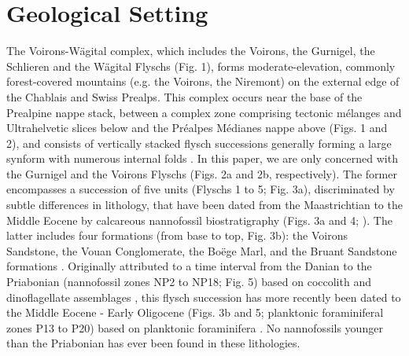 \documentclass[twoside]{article}
\begin{document}
\section{Geological Setting}

The Voirons-Wägital complex, which includes the Voirons, the Gurnigel, the Schlieren and the Wägital Flyschs (Fig. 1), forms moderate-elevation, commonly forest-covered mountains (e.g. the Voirons, the Niremont) on the external edge of the Chablais and Swiss Prealps. This complex occurs near the base of the Prealpine nappe stack, between a complex zone comprising tectonic mélanges and Ultrahelvetic slices below and the Préalpes Médianes nappe above (Figs. 1 and 2), and consists of vertically stacked flysch successions generally forming a large synform with numerous internal folds \citep{Weidmann1976a,Morel1980b,Winkler1983,Ospina-Ostios2017}. In this paper, we are only concerned with the Gurnigel and the Voirons Flyschs (Figs. 2a and 2b, respectively). The former encompasses a succession of five units (Flyschs 1 to 5; Fig. 3a), discriminated by subtle differences in lithology, that have been dated from the Maastrichtian to the Middle Eocene by calcareous nannofossil biostratigraphy (Figs. 3a and 4; \citealp{Weidmann1976a,Morel1980b}). The latter includes four formations (from base to top, Fig. 3b): the Voirons Sandstone, the Vouan Conglomerate, the Boëge Marl, and the Bruant Sandstone formations \citep{Ragusa2015}. Originally attributed to a time interval from the Danian to the Priabonian (nannofossil zones NP2 to NP18; Fig. 5) based on coccolith and dinoflagellate assemblages \citep{JanduChene1975c,Stuijvenberg1980a,Stuijvenberg1980b}, this flysch succession has more recently been dated to the Middle Eocene - Early Oligocene (Figs. 3b and 5; planktonic foraminiferal zones P13 to P20) based on planktonic foraminifera \citep{Ujetz1996,Coppo1999,Frebourg2006,Ospina-Ostios2013,Ospina-Ostios2017}. No nannofossils younger than the Priabonian has ever been found in these lithologies.\par
\end{document}
